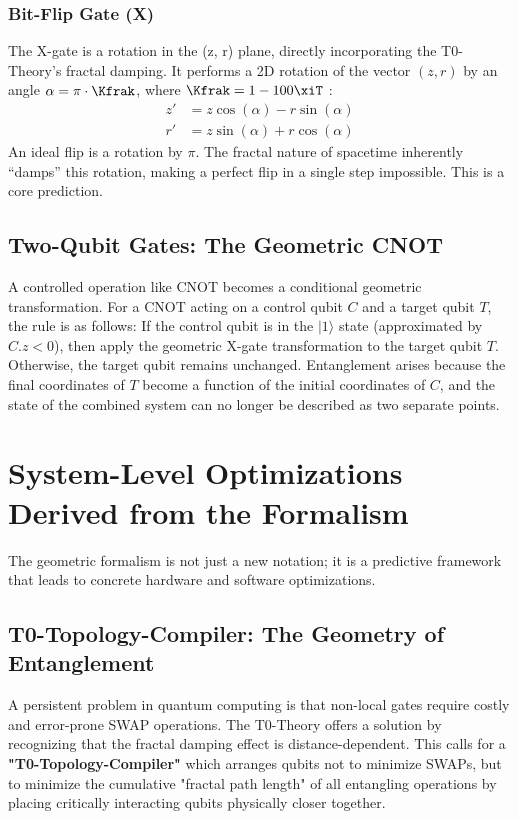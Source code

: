 	\subsubsection{Bit-Flip Gate (X)}
	The X-gate is a rotation in the (z, r) plane, directly incorporating the T0-Theory's fractal damping. It performs a 2D rotation of the vector $(z, r)$ by an angle $\alpha = \pi \cdot \Kfrak$, where $\Kfrak = 1 - 100\xiT$ \cite{pascher:fundamentals}:
	\begin{align}
		z' &= z \cos(\alpha) - r \sin(\alpha) \\
		r' &= z \sin(\alpha) + r \cos(\alpha)
	\end{align}
	An ideal flip is a rotation by $\pi$. The fractal nature of spacetime inherently ``damps'' this rotation, making a perfect flip in a single step impossible. This is a core prediction.
	
	\subsection{Two-Qubit Gates: The Geometric CNOT}
	A controlled operation like CNOT becomes a conditional geometric transformation. For a CNOT acting on a control qubit $C$ and a target qubit $T$, the rule is as follows: If the control qubit is in the $|1\rangle$ state (approximated by $C.z < 0$), then apply the geometric X-gate transformation to the target qubit $T$. Otherwise, the target qubit remains unchanged. Entanglement arises because the final coordinates of $T$ become a function of the initial coordinates of $C$, and the state of the combined system can no longer be described as two separate points.
	
	\section{System-Level Optimizations Derived from the Formalism}
	
	The geometric formalism is not just a new notation; it is a predictive framework that leads to concrete hardware and software optimizations.
	
	\subsection{T0-Topology-Compiler: The Geometry of Entanglement}
	A persistent problem in quantum computing is that non-local gates require costly and error-prone SWAP operations. The T0-Theory offers a solution by recognizing that the fractal damping effect \cite{pascher:ml_addendum} is distance-dependent. This calls for a \textbf{"T0-Topology-Compiler"} which arranges qubits not to minimize SWAPs, but to minimize the cumulative "fractal path length" of all entangling operations by placing critically interacting qubits physically closer together.
	
